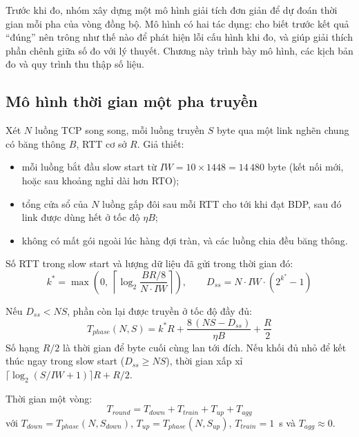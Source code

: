 \setcounter{section}{4}
\setcounter{equation}{0}
Trước khi đo, nhóm xây dựng một mô hình giải tích đơn giản để dự đoán thời gian mỗi pha của vòng đồng bộ. Mô hình có hai tác dụng: cho biết trước kết quả ``đúng'' nên trông như thế nào để phát hiện lỗi cấu hình khi đo, và giúp giải thích phần chênh giữa số đo với lý thuyết. Chương này trình bày mô hình, các kịch bản đo và quy trình thu thập số liệu.

\subsection{Mô hình thời gian một pha truyền}
Xét $N$ luồng TCP song song, mỗi luồng truyền $S$ byte qua một link nghẽn chung có băng thông $B$, RTT cơ sở $R$. Giả thiết:
\begin{itemize}
    \item mỗi luồng bắt đầu slow start từ $IW = 10 \times 1448 = 14\,480$ byte (kết nối mới, hoặc sau khoảng nghỉ dài hơn RTO);
    \item tổng cửa sổ của $N$ luồng gấp đôi sau mỗi RTT cho tới khi đạt BDP, sau đó link được dùng hết ở tốc độ $\eta B$;
    \item không có mất gói ngoài lúc hàng đợi tràn, và các luồng chia đều băng thông.
\end{itemize}

Số RTT trong slow start và lượng dữ liệu đã gửi trong thời gian đó:
\begin{equation}
    k^{*} = \max\!\left(0,\ \left\lceil \log_2 \frac{B R / 8}{N \cdot IW} \right\rceil\right), \qquad
    D_{ss} = N \cdot IW \cdot \left(2^{k^{*}} - 1\right)
    \label{eq:ss}
\end{equation}

Nếu $D_{ss} < N S$, phần còn lại được truyền ở tốc độ đầy đủ:
\begin{equation}
    T_{phase}(N, S) = k^{*} R + \frac{8\,(N S - D_{ss})}{\eta B} + \frac{R}{2}
    \label{eq:tphase}
\end{equation}
Số hạng $R/2$ là thời gian để byte cuối cùng lan tới đích. Nếu khối đủ nhỏ để kết thúc ngay trong slow start ($D_{ss} \geq N S$), thời gian xấp xỉ $\lceil \log_2(S/IW + 1) \rceil R + R/2$.

Thời gian một vòng:
\begin{equation}
    T_{round} = T_{down} + T_{train} + T_{up} + T_{agg}
    \label{eq:tround}
\end{equation}
với $T_{down} = T_{phase}(N, S_{down})$, $T_{up} = T_{phase}(N, S_{up})$, $T_{train} = 1$~s và $T_{agg} \approx 0$.

